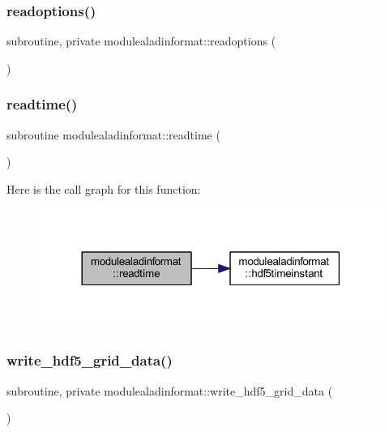 \subsubsection{\texorpdfstring{readoptions()}{readoptions()}}
{\footnotesize\ttfamily subroutine, private modulealadinformat\+::readoptions (\begin{DoxyParamCaption}{ }\end{DoxyParamCaption})\hspace{0.3cm}{\ttfamily [private]}}

\mbox{\label{namespacemodulealadinformat_a75d489bd9df9a1d8553c1154e13368f1}} 
\subsubsection{\texorpdfstring{readtime()}{readtime()}}
{\footnotesize\ttfamily subroutine modulealadinformat\+::readtime (\begin{DoxyParamCaption}{ }\end{DoxyParamCaption})\hspace{0.3cm}{\ttfamily [private]}}

Here is the call graph for this function\+:\nopagebreak
\begin{figure}[H]
\begin{center}
\leavevmode
\includegraphics[width=318pt]{namespacemodulealadinformat_a75d489bd9df9a1d8553c1154e13368f1_cgraph}
\end{center}
\end{figure}
\mbox{\label{namespacemodulealadinformat_aae0b88b8feec26aab01ab56220392544}} 
\subsubsection{\texorpdfstring{write\+\_\+hdf5\+\_\+grid\+\_\+data()}{write\_hdf5\_grid\_data()}}
{\footnotesize\ttfamily subroutine, private modulealadinformat\+::write\+\_\+hdf5\+\_\+grid\+\_\+data (\begin{DoxyParamCaption}{ }\end{DoxyParamCaption})\hspace{0.3cm}{\ttfamily [private]}}

